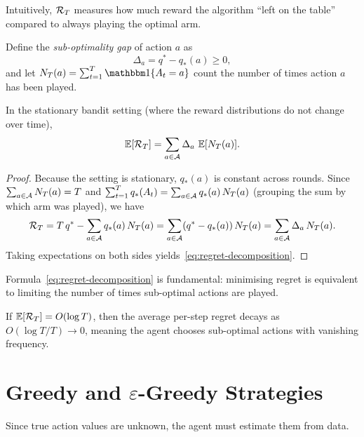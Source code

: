 Intuitively, $\mathcal{R}_T$ measures how much reward the algorithm ``left on the table'' compared to always playing the optimal arm.

Define the \emph{sub-optimality gap} of action $a$ as
\begin{equation}
\label{eq:gap}
\Delta_a = q^* - q_*(a) \ge 0,
\end{equation}
and let $N_T(a) = \sum_{t=1}^{T}\ind\{A_t = a\}$ count the number of times action $a$ has been played.

\begin{proposition}
\label{prop:regret-decomp}
In the stationary bandit setting (where the reward distributions do not change over time),
\begin{equation}
\label{eq:regret-decomposition}
\operatorname{\mathbb{E}}[\mathcal{R}_T] = \sum_{a\in\mathcal{A}} \Delta_a\,\operatorname{\mathbb{E}}[N_T(a)].
\end{equation}
\end{proposition}

\begin{proof}
Because the setting is stationary, $q_*(a)$ is constant across rounds.
Since $\sum_{a\in\mathcal{A}}N_T(a)=T$ and $\sum_{t=1}^{T}q_*(A_t)=\sum_{a\in\mathcal{A}}q_*(a)\,N_T(a)$ (grouping the sum by which arm was played), we have
\[
\mathcal{R}_T
= T\,q^* - \sum_{a\in\mathcal{A}}q_*(a)\,N_T(a)
= \sum_{a\in\mathcal{A}}(q^*-q_*(a))\,N_T(a)
= \sum_{a\in\mathcal{A}}\Delta_a\,N_T(a).
\]
Taking expectations on both sides yields~\eqref{eq:regret-decomposition}.
\end{proof}

Formula~\eqref{eq:regret-decomposition} is fundamental: minimising regret is equivalent to limiting the number of times sub-optimal actions are played.

\begin{remark}
If $\operatorname{\mathbb{E}}[\mathcal{R}_T]=O(\log T)$, then the average per-step regret decays as $O(\log T/T)\to 0$, meaning the agent chooses sub-optimal actions with vanishing frequency.
\end{remark}


\section{Greedy and \texorpdfstring{$\varepsilon$}{epsilon}-Greedy Strategies}
\label{sec:eps-greedy}

Since true action values are unknown, the agent must estimate them from data.

